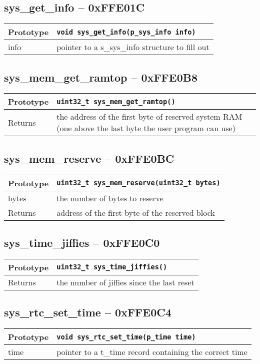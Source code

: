 \subsection*{sys\_get\_info -- 0xFFE01C}
\begin{tabular}{|l||l|} \hline
Prototype & \lstinline!void sys_get_info(p_sys_info info)! \\ \hline
info & pointer to a s\_sys\_info structure to fill out \\ \hline
\end{tabular}

\subsection*{sys\_mem\_get\_ramtop -- 0xFFE0B8}
\begin{tabular}{|l||l|} \hline
Prototype & \lstinline!uint32_t sys_mem_get_ramtop()! \\ \hline
Returns & the address of the first byte of reserved system RAM (one above the last byte the user program can use) \\ \hline
\end{tabular}

\subsection*{sys\_mem\_reserve -- 0xFFE0BC}
\begin{tabular}{|l||l|} \hline
Prototype & \lstinline!uint32_t sys_mem_reserve(uint32_t bytes)! \\ \hline
bytes & the number of bytes to reserve \\ \hline
Returns & address of the first byte of the reserved block \\ \hline
\end{tabular}

\subsection*{sys\_time\_jiffies -- 0xFFE0C0}
\begin{tabular}{|l||l|} \hline
Prototype & \lstinline!uint32_t sys_time_jiffies()! \\ \hline
Returns & the number of jiffies since the last reset \\ \hline
\end{tabular}

\subsection*{sys\_rtc\_set\_time -- 0xFFE0C4}
\begin{tabular}{|l||l|} \hline
Prototype & \lstinline!void sys_rtc_set_time(p_time time)! \\ \hline
time & pointer to a t\_time record containing the correct time \\ \hline
\end{tabular}

